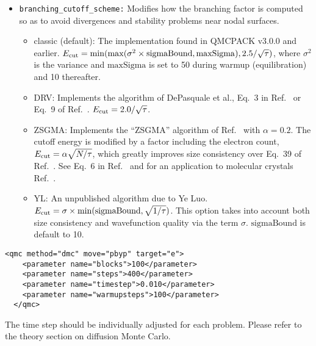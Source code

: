 \begin{itemize}


\item \texttt{branching\_cutoff\_scheme:} Modifies how the branching factor is computed so as to avoid divergences and stability
problems near nodal surfaces. 
\begin{itemize}
  \item classic (default): The implementation found in QMCPACK v3.0.0 and earlier.
	  $E_{\rm cut}=\mathrm{min}(\mathrm{max}(\sigma^2 \times \mathrm{sigmaBound},\mathrm{maxSigma}),2.5/\sqrt{\tau})$,
  where $\sigma^2$ is the variance and $\mathrm{maxSigma}$ is set to 50 during warmup (equilibration) and 10 thereafter.
  \item DRV: Implements the algorithm of DePasquale et al., Eq.~3 in Ref.~\cite{DePasqualeReliable1988} or Eq.~9 of Ref.~\cite{Umrigar1993}.
  $E_{\rm cut}=2.0/\sqrt{\tau}$.
  \item ZSGMA: Implements the ``ZSGMA'' algorithm of Ref.~\cite{ZenBoosting2016} with $\alpha=0.2$. The cutoff energy is modified by a factor including the
  electron count, $E_{\rm cut}=\alpha \sqrt{N/\tau}$, which greatly improves size consistency over Eq.~39 of Ref.~\cite{Umrigar1993}. See Eq.~6 in Ref.~\cite{ZenBoosting2016} and for
  an application to molecular crystals Ref.~\cite{ZenFast2018}.
  \item YL: An unpublished algorithm due to Ye Luo. $E_{\rm cut}=\sigma\times\mathrm{min}(\mathrm{sigmaBound},\sqrt{1/\tau})$. This option takes into account both size consistency and wavefunction quality via the term $\sigma$. $\mathrm{sigmaBound}$ is default to 10.
\end{itemize}

\end{itemize}

\begin{lstlisting}[style=QMCPXML,caption=The following is an example of a very simple DMC section. ]
  <qmc method="dmc" move="pbyp" target="e">
    <parameter name="blocks">100</parameter>
    <parameter name="steps">400</parameter>
    <parameter name="timestep">0.010</parameter>
    <parameter name="warmupsteps">100</parameter>
  </qmc>
\end{lstlisting}
The time step should be individually adjusted for each problem.  Please refer to the theory section
on diffusion Monte Carlo.


